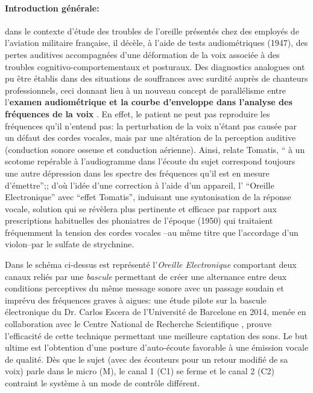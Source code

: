  \paragraph{Introduction générale:} dans le contexte d'étude des troubles de
l'oreille présentés chez des employés de l'aviation militaire
française, il décèle, à l'aide
de tests audiométriques
 (1947), des pertes auditives accompagnées d'une
déformation de la voix associée à des troubles
cognitivo-comportementaux et posturaux. %
Des diagnostics analogues ont pu être établis dans des situations
de souffrances avec surdité auprès de chanteurs professionnels,
ceci donnant lieu
à un nouveau concept de
parallélisme entre l'\textbf{examen audiométrique et la courbe
d'enveloppe dans l'analyse des fréquences de la voix} \autocite {tomatisoreilletvie}.
En effet, le patient ne peut pas reproduire les fréquences qu'il
n'entend pas:
la perturbation de la voix n'étant pas causée par un défaut des cordes
vocales, mais par une altération de la perception auditive (conduction
sonore osseuse et conduction aérienne). Ainsi, relate Tomatis, \enquote{ à un scotome repérable à 
l'audiogramme dans l'écoute du sujet correspond toujours une autre dépression dans les spectre des 
fréquences qu'il est en mesure d'émettre};\autocite [75] {tomatisoreilletvie}; d'où
l'idée d'une correction à l'aide d'un appareil, l' ``Oreille
Electronique'' avec ``effet Tomatis'', induisant
une syntonisation de la réponse vocale, solution qui se révèlera plus pertinente et efficace par rapport aux prescriptions habituelles des phoniatres de
l'époque (1950) qui traitaient fréquemment la tension des cordes vocales --au même titre que
l'accordage d'un violon--par le sulfate de
strychnine\autocite {tomatisoreilletvie}.

Dans le schéma ci-dessus  est représenté l'\textit{Oreille Electronique}
comportant deux canaux reliés par une
\textit{bascule}  permettant de créer une alternance entre deux conditions perceptives du même message sonore avec un passage soudain et imprévu des fréquences graves à aigues: une étude pilote sur la bascule électronique du Dr. Carlos Escera
de l'Université de Barcelone en 2014, menée en collaboration avec le
Centre National de Recherche Scientifique \autocite{escera-key}, prouve l'efficacité de cette technique permettant
une meilleure
captation des sons. %
Le but ultime est l'obtention d'une posture d'auto-écoute favorable à une
          émission vocale de qualité.
Dès que le sujet (avec
des écouteurs pour un retour modifié de sa voix) parle
dans le micro (M), le canal 1 (C1) se ferme et  le canal 2 (C2) contraint le
système à un mode de contrôle différent.

